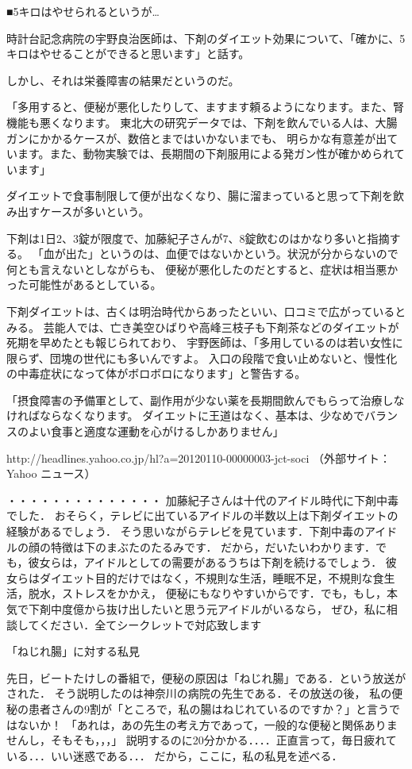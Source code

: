 ■5キロはやせられるというが… 

時計台記念病院の宇野良治医師は、下剤のダイエット効果について、「確かに、5キロはやせることができると思います」と話す。

しかし、それは栄養障害の結果だというのだ。 

「多用すると、便秘が悪化したりして、ますます頼るようになります。また、腎機能も悪くなります。
東北大の研究データでは、下剤を飲んでいる人は、大腸ガンにかかるケースが、数倍とまではいかないまでも、
明らかな有意差が出ています。また、動物実験では、長期間の下剤服用による発ガン性が確かめられています」 

ダイエットで食事制限して便が出なくなり、腸に溜まっていると思って下剤を飲み出すケースが多いという。 

下剤は1日2、3錠が限度で、加藤紀子さんが7、8錠飲むのはかなり多いと指摘する。
「血が出た」というのは、血便ではないかという。状況が分からないので何とも言えないとしながらも、
便秘が悪化したのだとすると、症状は相当悪かった可能性があるとしている。

下剤ダイエットは、古くは明治時代からあったといい、口コミで広がっているとみる。
芸能人では、亡き美空ひばりや高峰三枝子も下剤茶などのダイエットが死期を早めたとも報じられており、
宇野医師は、「多用しているのは若い女性に限らず、団塊の世代にも多いんですよ。
入口の段階で食い止めないと、慢性化の中毒症状になって体がボロボロになります」と警告する。

「摂食障害の予備軍として、副作用が少ない薬を長期間飲んでもらって治療しなければならなくなります。
ダイエットに王道はなく、基本は、少なめでバランスのよい食事と適度な運動を心がけるしかありません」 

http://headlines.yahoo.co.jp/hl?a=20120110-00000003-jct-soci 
（外部サイト：Yahoo ニュース）

・・・・・・・・・・・・・・
加藤紀子さんは十代のアイドル時代に下剤中毒でした．
おそらく，テレビに出ているアイドルの半数以上は下剤ダイエットの経験があるでしょう．
そう思いながらテレビを見ています．下剤中毒のアイドルの顔の特徴は下のまぶたのたるみです．
だから，だいたいわかります．でも，彼女らは，アイドルとしての需要があるうちは下剤を続けるでしょう．
彼女らはダイエット目的だけではなく，不規則な生活，睡眠不足，不規則な食生活，脱水，ストレスをかかえ，
便秘にもなりやすいからです．でも，もし，本気で下剤中度億から抜け出したいと思う元アイドルがいるなら，
ぜひ，私に相談してください．全てシークレットで対応致します

「ねじれ腸」に対する私見

先日，ビートたけしの番組で，便秘の原因は「ねじれ腸」である．という放送がされた．
そう説明したのは神奈川の病院の先生である．その放送の後，
私の便秘の患者さんの9割が「ところで，私の腸はねじれているのですか？」と言うではないか！
「あれは，あの先生の考え方であって，一般的な便秘と関係ありませんし，そもそも，，，」 
説明するのに20分かかる．．．．正直言って，毎日疲れている．．．いい迷惑である．．．
だから，ここに，私の私見を述べる．

